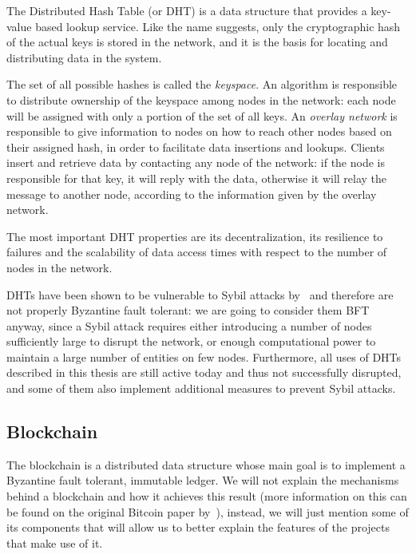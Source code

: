 \documentclass[mscthesis]{usiinfthesis}
\begin{document}
The Distributed Hash Table (or DHT) is a data structure that provides a key-value based lookup service. Like the name suggests, only the cryptographic hash of the actual keys is stored in the network, and it is the basis for locating and distributing data in the system.

The set of all possible hashes is called the \emph{keyspace}. An algorithm is responsible to distribute ownership of the keyspace among nodes in the network: each node will be assigned with only a portion of the set of all keys. An \emph{overlay network} is responsible to give information to nodes on how to reach other nodes based on their assigned hash, in order to facilitate data insertions and lookups. Clients insert and retrieve data by contacting any node of the network: if the node is responsible for that key, it will reply with the data, otherwise it will relay the message to another node, according to the information given by the overlay network.

The most important DHT properties are its decentralization, its resilience to failures and the scalability of data access times with respect to the number of nodes in the network.

DHTs have been shown to be vulnerable to Sybil attacks by~\cite{wang2012real} and therefore are not properly Byzantine fault tolerant: we are going to consider them BFT anyway, since a Sybil attack requires either introducing a number of nodes sufficiently large to disrupt the network, or enough computational power to maintain a large number of entities on few nodes. Furthermore, all uses of DHTs described in this thesis are still active today and thus not successfully disrupted, and some of them also implement additional measures to prevent Sybil attacks.

\subsection{Blockchain}\label{tech:blockchain}

The blockchain is a distributed data structure whose main goal is to implement a Byzantine fault tolerant, immutable ledger.
We will not explain the mechanisms behind a blockchain and how it achieves this result (more information on this can be found on the original Bitcoin paper by~\cite{bitcoin}),
instead, we will just mention some of its components that will allow us to better explain the features of the projects that make use of it.
\end{document}
